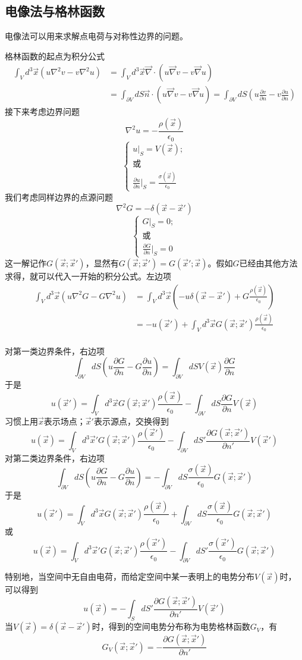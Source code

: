\documentclass[a4paper,11pt]{ctexart}
\newcommand{\beq}{\begin{equation}}
\newcommand{\eeq}{\end{equation}}
\newcommand{\bea}{\begin{equation}\begin{aligned}}
\newcommand{\eea}{\end{aligned}\end{equation}}
\newcommand{\del}{\vec{\nabla}}
\newcommand{\pfrac}[2]{\frac{\partial #1}{\partial #2}}
\begin{document}
\subsection{电像法与格林函数}
电像法可以用来求解点电荷与对称性边界的问题。\par
格林函数的起点为积分公式
\bea
\int_V d^3 \vec{x} (u \nabla^2 v -v \nabla^2 u) &= \int_V d^3 \vec{x} \del \cdot( u \del v -v \del u) \\
&= \int_{\partial V} dS \vec n \cdot ( u \del v -v \del u) = \int_{\partial V} dS ( u \pfrac{v}{n} -v \pfrac{u}{n})
\eea
接下来考虑边界问题
\beq
\nabla^2 u = -\frac{\rho(\vec x)}{\epsilon_0}
\eeq
\beq
\begin{cases}
u\big|_{S} = V(\vec x) ;\\
\text{或} \\
\pfrac{u}{n}\big|_{S} = \frac{\sigma(\vec{x})}{\epsilon_0}
\end{cases}
\eeq
我们考虑同样边界的点源问题
\beq
\nabla^2 G = -\delta(\vec x - \vec{x}')
\eeq
\beq
\begin{cases}
G\big|_{S} = 0 ;\\
\text{或} \\
\pfrac{G}{n}\big|_{S} = 0
\end{cases}
\eeq
这一解记作$G(\vec x; \vec{x}')$，显然有$G(\vec x; \vec{x}') = G(\vec{x}'; \vec{x}) $。假如$G$已经由其他方法求得，就可以代入一开始的积分公式。左边项
\bea
\int_V d^3 \vec{x} (u \nabla^2 G -G \nabla^2 u)  &= \int_V d^3 \vec{x} (-u\delta(\vec x - \vec{x}') + G \frac{\rho(\vec x)} {\epsilon_0}) \\
&= -u(\vec{x}') + \int_V d^3 \vec{x} G(\vec x; \vec{x}') \frac{\rho(\vec x)} {\epsilon_0}\\
\eea
\par
对第一类边界条件，右边项
\beq
\int_{\partial V} dS ( u \pfrac{G}{n} -G \pfrac{u}{n}) = \int_{\partial V} dS V(\vec x)  \pfrac{G}{n} 
\eeq
于是
\beq
u(\vec{x}') = \int_V d^3 \vec{x} G(\vec x; \vec{x}') \frac{\rho(\vec x)} {\epsilon_0} - \int_{\partial V} dS  \pfrac{G}{n} V(\vec x) 
\eeq
习惯上用$\vec{x}$表示场点；$\vec{x}'$表示源点，交换得到
\beq
u(\vec{x}) = \int_V d^3 \vec{x}' G(\vec x; \vec{x}') \frac{\rho(\vec{x}')} {\epsilon_0} - \int_{\partial V} dS' \pfrac{G(\vec x; \vec{x}')}{n'} V(\vec x')  
\eeq
对第二类边界条件，右边项
\beq
\int_{\partial V} dS ( u \pfrac{G}{n} -G \pfrac{u}{n}) = -\int_{\partial V} dS  \frac{\sigma(\vec{x})}{\epsilon_0}G(\vec x; \vec{x}' )
\eeq
于是
\beq
u(\vec{x}') = \int_V d^3 \vec{x} G(\vec x; \vec{x}') \frac{\rho(\vec x)} {\epsilon_0} + \int_{\partial V} dS \frac{\sigma(\vec{x})} {\epsilon_0}G(\vec x; \vec{x}' )
\eeq
或
\beq
u(\vec{x}) = \int_V d^3 \vec{x}' G(\vec x; \vec{x}') \frac{\rho(\vec{x}')} {\epsilon_0} - \int_{\partial V} dS' \frac{\sigma(\vec{x}')}{\epsilon_0} G(\vec x; \vec{x}' )
\eeq
\par
特别地，当空间中无自由电荷，而给定空间中某一表明上的电势分布$V(\vec x)$时，可以得到
\beq
u(\vec{x}) = - \int_{S} dS' \pfrac{G(\vec x; \vec{x}')}{n'} V(\vec x')  
\eeq
当$V(\vec x ) = \delta ( \vec x- \vec x ')$时，得到的空间电势分布称为电势格林函数$G_V$，有
\beq
G_V(\vec{x};\vec{x}') = -\pfrac{G(\vec x; \vec{x}')}{n'}
\eeq
\end{document}
